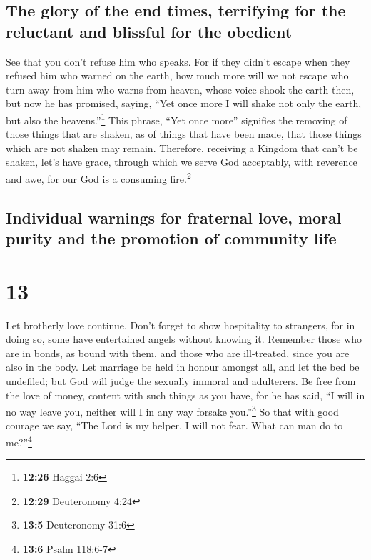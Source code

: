 \hypertarget{the-glory-of-the-end-times-terrifying-for-the-reluctant-and-blissful-for-the-obedient}{%
\subsection{The glory of the end times, terrifying for the reluctant and
blissful for the
obedient}\label{the-glory-of-the-end-times-terrifying-for-the-reluctant-and-blissful-for-the-obedient}}

 See that you don't refuse him who speaks. For if they
didn't escape when they refused him who warned on the earth, how much
more will we not escape who turn away from him who warns from heaven,
 whose voice shook the earth then, but now he has
promised, saying, ``Yet once more I will shake not only the earth, but
also the heavens.''\footnote{\textbf{12:26} Haggai 2:6} 
This phrase, ``Yet once more'' signifies the removing of those things
that are shaken, as of things that have been made, that those things
which are not shaken may remain.  Therefore, receiving a
Kingdom that can't be shaken, let's have grace, through which we serve
God acceptably, with reverence and awe,  for our God is a
consuming fire.\footnote{\textbf{12:29} Deuteronomy 4:24}

\hypertarget{individual-warnings-for-fraternal-love-moral-purity-and-the-promotion-of-community-life}{%
\subsection{Individual warnings for fraternal love, moral purity and the
promotion of community
life}\label{individual-warnings-for-fraternal-love-moral-purity-and-the-promotion-of-community-life}}

\hypertarget{section-12}{%
\section{13}\label{section-12}}

 Let brotherly love continue.  Don't forget
to show hospitality to strangers, for in doing so, some have entertained
angels without knowing it.  Remember those who are in
bonds, as bound with them, and those who are ill-treated, since you are
also in the body.  Let marriage be held in honour amongst
all, and let the bed be undefiled; but God will judge the sexually
immoral and adulterers.  Be free from the love of money,
content with such things as you have, for he has said, ``I will in no
way leave you, neither will I in any way forsake you.''\footnote{\textbf{13:5}
  Deuteronomy 31:6}  So that with good courage we say,
``The Lord is my helper. I will not fear. What can man do to
me?''\footnote{\textbf{13:6} Psalm 118:6-7}

